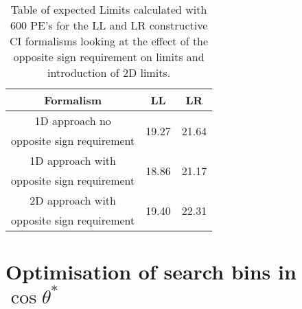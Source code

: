 	\begin {table}[h]
        \begin{center}
        \begin{tabular}{ | c | c | c | } 
            \hline
            \hline
            Formalism & LL & LR \\
            \hline
            1D approach no & \multirow{2}{*}{19.27} & \multirow{2}{*}{21.64} \\
            opposite sign requirement & & \\
            1D approach with & \multirow{2}{*}{18.86} & \multirow{2}{*}{21.17} \\
            opposite sign requirement & & \\
            2D approach with & \multirow{2}{*}{19.40} & \multirow{2}{*}{22.31} \\
            opposite sign requirement & & \\
            \hline
            \hline
        \end{tabular}
        \caption{Table of expected Limits calculated with 600 PE's for the LL and LR constructive CI formalisms looking at the effect of the opposite sign requirement on limits and introduction of 2D limits.}
        \label{tab:limits_oppSign}
        \end{center}
    \end {table}



\section{Optimisation of search bins in $\cos{\theta^{*}}$}

